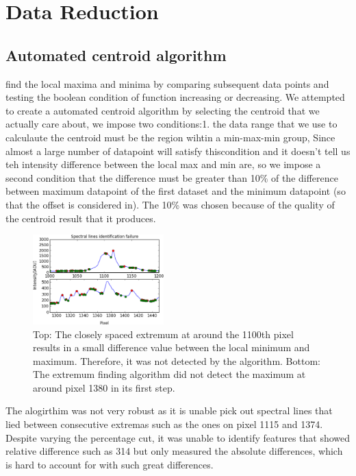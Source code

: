 \documentclass[authoryear, 12pt,5p, times]{elsarticle}
\begin{document}
\section{Data Reduction}
	\subsection{Automated centroid algorithm}
	find the local maxima and minima by comparing subsequent data points and testing the boolean condition of function increasing or decreasing.
We attempted to create a automated centroid algorithm by selecting the centroid that we actually care about, we impose two conditions:1. the data range that we use to calculaute the centroid must be the region wihtin a min-max-min group, Since almost a large number of datapoint will satisfy thiscondition and it doesn't tell us teh intensity difference between the local max and min are, so we impose a second condition that the difference must be greater than 10\% of the difference between maximum datapoint of the first dataset and the minimum datapoint (so that the offset is considered in). The 10\% was chosen because of the quality of the centroid result that it produces.
\begin{figure}
\includegraphics[width=0.45\textwidth]{figures/fail}
\caption{Top: The closely spaced extremum at around the 1100th pixel results in a small difference value between the local minimum and maximum. Therefore, it was not detected by the algorithm. Bottom: The extremum finding algorithm did not detect the maximum at around pixel 1380 in its  first step.}
\end{figure}
	The alogirthim was not very robust as it is unable pick out spectral lines that lied between consecutive extremas such as the ones on pixel 1115 and 1374. Despite varying the percentage cut, it was unable to identify features that showed relative difference such as 314 but only measured the absolute differences, which is hard to account for with such great differences.
\end{document}
